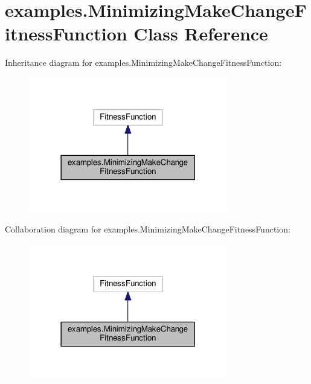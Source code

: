 \hypertarget{classexamples_1_1_minimizing_make_change_fitness_function}{\section{examples.\-Minimizing\-Make\-Change\-Fitness\-Function Class Reference}
\label{classexamples_1_1_minimizing_make_change_fitness_function}
}


Inheritance diagram for examples.\-Minimizing\-Make\-Change\-Fitness\-Function\-:
\nopagebreak
\begin{figure}[H]
\begin{center}
\leavevmode
\includegraphics[width=246pt]{classexamples_1_1_minimizing_make_change_fitness_function__inherit__graph}
\end{center}
\end{figure}


Collaboration diagram for examples.\-Minimizing\-Make\-Change\-Fitness\-Function\-:
\nopagebreak
\begin{figure}[H]
\begin{center}
\leavevmode
\includegraphics[width=246pt]{classexamples_1_1_minimizing_make_change_fitness_function__coll__graph}
\end{center}
\end{figure}
